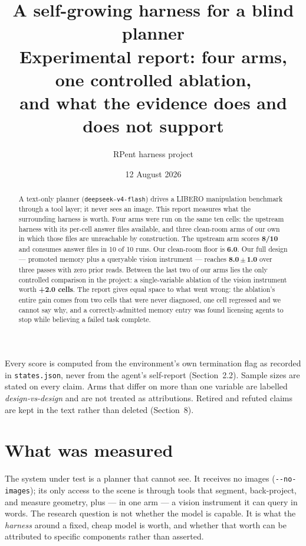 \documentclass[11pt,a4paper]{article}
\title{\vspace{-1.5em}\textbf{A self-growing harness for a blind planner}\\[0.3em]
\large Experimental report: four arms, one controlled ablation,\\
and what the evidence does and does not support}
\author{RPent harness project}
\date{12 August 2026}
\begin{document}
\maketitle
\thispagestyle{fancy}

\begin{abstract}
\noindent
A text-only planner (\texttt{deepseek-v4-flash}) drives a LIBERO manipulation
benchmark through a tool layer; it never sees an image. This report measures
what the surrounding harness is worth. Four arms were run on the same ten cells:
the upstream harness with its per-cell answer files available, and three
clean-room arms of our own in which those files are unreachable by
construction. The upstream arm scores \textbf{8/10} and consumes answer files in
10 of 10 runs. Our clean-room floor is \textbf{6.0}. Our full design ---
promoted memory plus a queryable vision instrument --- reaches
\textbf{8.0\,$\pm$\,1.0} over three passes with zero prior reads. Between the
last two of our arms lies the only controlled comparison in the project: a
single-variable ablation of the vision instrument worth \textbf{+2.0 cells}.
The report gives equal space to what went wrong: the ablation's entire gain
comes from two cells that were never diagnosed, one cell regressed and we cannot
say why, and a correctly-admitted memory entry was found licensing agents to
stop while believing a failed task complete.
\end{abstract}

\vspace{0.5em}
\begin{caution}[title={Reading rules for every number in this report}]
Every score is computed from the environment's own termination flag as recorded
in \texttt{states.json}, never from the agent's self-report (Section~2.2).
Sample sizes are stated on every claim. Arms that differ on more than one
variable are labelled \emph{design-vs-design} and are not treated as
attributions. Retired and refuted claims are kept in the text rather than
deleted (Section~8).
\end{caution}

\newpage
\tableofcontents
\newpage

\section{What was measured}

The system under test is a planner that cannot see. It receives no images
(\texttt{-{}-no-images}); its only access to the scene is through tools that
segment, back-project, and measure geometry, plus --- in one arm --- a
vision instrument it can query in words. The research question is not whether
the model is capable. It is what the \emph{harness} around a fixed, cheap model
is worth, and whether that worth can be attributed to specific components
rather than asserted.
\end{document}
